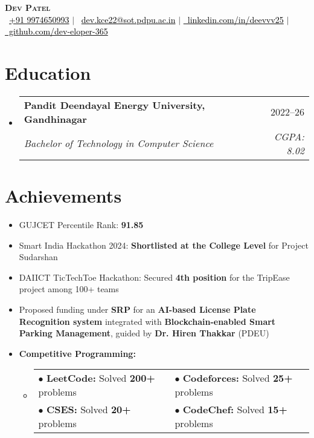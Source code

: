 \documentclass[letterpaper,11pt]{article}
\makeatletter
\newcommand{\resumeItem}[1]{\item\small{#1 \vspace{-2pt}}}
\newcommand{\resumeSubheading}[4]{
  \vspace{-2pt}\item
  \begin{tabular*}{0.97\textwidth}[t]{l@{\extracolsep{\fill}}r}
    \textbf{#1} & #2 \\
    \textit{\small#3} & \textit{\small #4} \\
  \end{tabular*}\vspace{-7pt}
}
\newcommand{\resumeItemListStart}{\begin{itemize}}
\newcommand{\resumeItemListEnd}{\end{itemize}\vspace{-5pt}}
\newcommand{\resumeSubHeadingListStart}{\begin{itemize}[leftmargin=0.15in, label={}]}
\newcommand{\resumeSubHeadingListEnd}{\end{itemize}}
\makeatother
\begin{document}
\begin{center}
  \textbf{\Huge \scshape Dev Patel} \\
  \small 
  \faPhone\ \href{tel:+919974650993}{\textcolor{black}{+91 9974650993}} $|$
  \faEnvelope\ \href{mailto:dev.kce22@sot.pdpu.ac.in}{\textcolor{black}{dev.kce22@sot.pdpu.ac.in}} $|$
  \href{https://linkedin.com/in/deevvv25}{\textcolor{black}{\faLinkedin\ linkedin.com/in/deevvv25}} $|$
  \href{https://github.com/dev-eloper-365}{\textcolor{black}{\faGithub\ github.com/dev-eloper-365}}
\end{center}




\section{Education}
\resumeSubHeadingListStart
    \resumeSubheading
      {Pandit Deendayal Energy University, Gandhinagar}
      {2022–26}
      {Bachelor of Technology in Computer Science}
      {CGPA: 8.02}
\resumeSubHeadingListEnd

\section{Achievements}
\resumeSubHeadingListStart
  \resumeItemListStart
    \resumeItem{GUJCET Percentile Rank: \textbf{91.85}}
    \resumeItem{Smart India Hackathon 2024: \textbf{Shortlisted at the College Level} for Project Sudarshan}
    \resumeItem{DAIICT TicTechToe Hackathon: Secured \textbf{4th position} for the TripEase project among 100+ teams}
    \resumeItem{Proposed funding under \textbf{SRP} for an \textbf{AI-based License Plate Recognition system} integrated with \textbf{Blockchain-enabled Smart Parking Management}, guided by \textbf{Dr. Hiren Thakkar} (PDEU)}
  \resumeItemListEnd

  \vspace{-8pt}\resumeItemListStart
  \resumeItem{\textbf{Competitive Programming:}}
  \vspace{-6pt}
  \begin{itemize}[leftmargin=0.3in]
    \item[]
      \begin{tabularx}{\textwidth}{X X}
        $\bullet$ \textbf{LeetCode:} Solved \textbf{200+} problems &
        $\bullet$ \textbf{Codeforces:} Solved \textbf{25+} problems \\
        $\bullet$ \textbf{CSES:} Solved \textbf{20+} problems &
        $\bullet$ \textbf{CodeChef:} Solved \textbf{15+} problems
      \end{tabularx}
  \end{itemize}
  \resumeItemListEnd
\resumeSubHeadingListEnd
\end{document}
